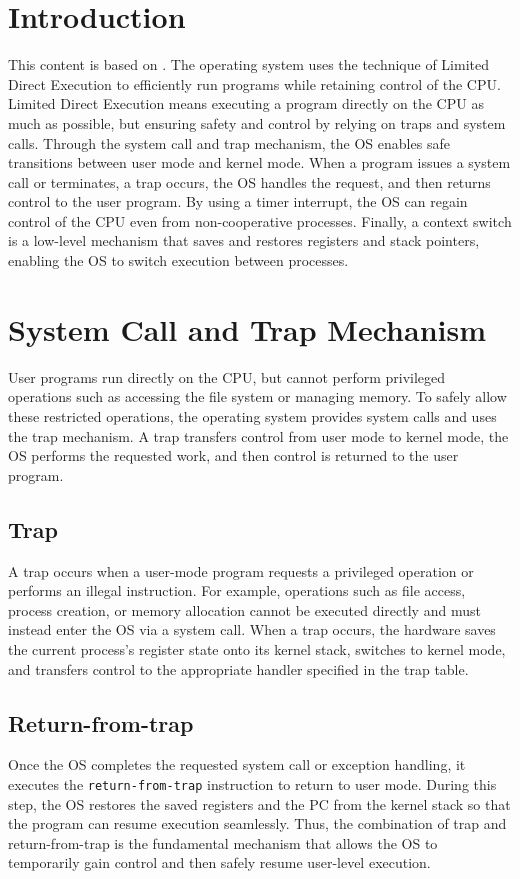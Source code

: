 \section{Introduction}
This content is based on \cite{ArpaciDusseau23-Book}.
The operating system uses the technique of Limited Direct Execution to efficiently run programs while retaining control of the CPU.
Limited Direct Execution means executing a program directly on the CPU as much as possible, but ensuring safety and control by relying on traps and system calls.
Through the system call and trap mechanism, the OS enables safe transitions between user mode and kernel mode.
When a program issues a system call or terminates, a trap occurs, the OS handles the request, and then returns control to the user program.
By using a timer interrupt, the OS can regain control of the CPU even from non-cooperative processes.
Finally, a context switch is a low-level mechanism that saves and restores registers and stack pointers, enabling the OS to switch execution between processes.

\section{System Call and Trap Mechanism}
User programs run directly on the CPU, but cannot perform privileged operations such as accessing the file system or managing memory.
To safely allow these restricted operations, the operating system provides system calls and uses the trap mechanism.
A trap transfers control from user mode to kernel mode, the OS performs the requested work, and then control is returned to the user program.

\subsection{Trap}
A trap occurs when a user-mode program requests a privileged operation or performs an illegal instruction.
For example, operations such as file access, process creation, or memory allocation cannot be executed directly and must instead enter the OS via a system call.
When a trap occurs, the hardware saves the current process’s register state onto its kernel stack, switches to kernel mode, and transfers control to the appropriate handler specified in the trap table.

\subsection{Return-from-trap}
Once the OS completes the requested system call or exception handling, it executes the \texttt{return-from-trap} instruction to return to user mode.
During this step, the OS restores the saved registers and the PC from the kernel stack so that the program can resume execution seamlessly.
Thus, the combination of trap and return-from-trap is the fundamental mechanism that allows the OS to temporarily gain control and then safely resume user-level execution.

